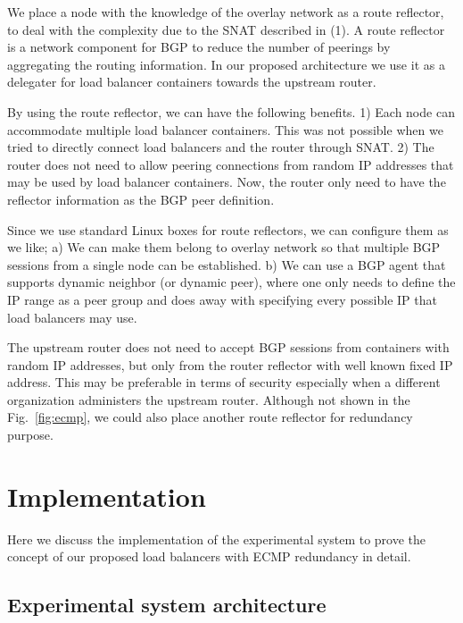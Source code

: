 %
We place a node with the knowledge of the overlay network as a route reflector, to deal with the complexity due to the SNAT described in (1).
A route reflector is a network component for BGP to reduce the number of peerings by aggregating the routing information\cite{rfc4456}.
In our proposed architecture we use it as a delegater for load balancer containers towards the upstream router.

By using the route reflector, we can have the following benefits.
1) Each node can accommodate multiple load balancer containers. This was not possible when we tried to directly connect load balancers and the router through SNAT.
2) The router does not need to allow peering connections from random IP addresses that may be used by load balancer containers. Now, the router only need to have the reflector information as the BGP peer definition.

Since we use standard Linux boxes for route reflectors, we can configure them as we like;
a) We can make them belong to overlay network so that multiple BGP sessions from a single node can be established.
b) We can use a BGP agent that supports dynamic neighbor (or dynamic peer), where one only needs to define the IP range as a peer group and does away with specifying every possible IP that load balancers may use.

The upstream router does not need to accept BGP sessions from containers with random IP addresses, but only from the router reflector with well known fixed IP address. This may be preferable in terms of security especially when a different organization administers the upstream router.
Although not shown in the Fig.~\ref{fig:ecmp}, we could also place another route reflector for redundancy purpose.


\section{Implementation}\label{Implementation}

Here we discuss the implementation of the experimental system to prove the concept of our proposed load balancers with ECMP redundancy in detail.

\subsection{Experimental system architecture}

